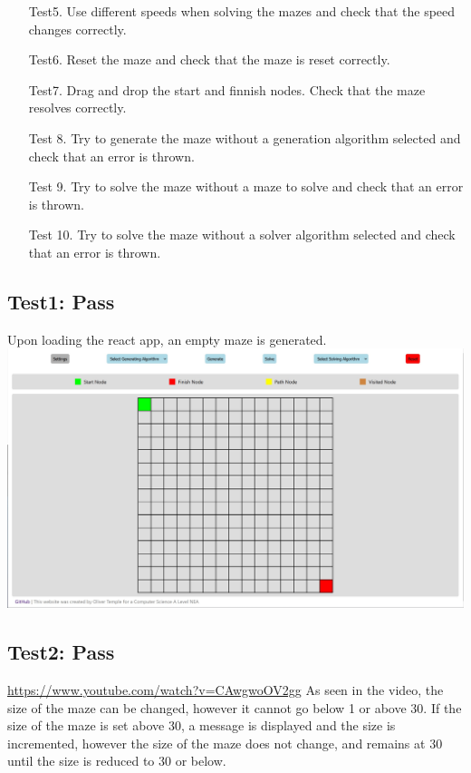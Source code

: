 \documentclass[titlepage]{article}
\begin{document}
\begin{enumerate}
\begin{enumerate}
    \end{enumerate} 
    \item[Test5.] Use different speeds when solving the mazes and check that the speed changes correctly.
    \item[Test6.] Reset the maze and check that the maze is reset correctly.
    \item[Test7.] Drag and drop the start and finnish nodes. Check that the maze resolves correctly. 
    \item[Test 8.] Try to generate the maze without a generation algorithm selected and check that an error is thrown.
    \item[Test 9.] Try to solve the maze without a maze to solve and check that an error is thrown.  
    \item[Test 10.] Try to solve the maze without a solver algorithm selected and check that an error is thrown. 
\end{enumerate}

\subsection*{Test1: Pass}
Upon loading the react app, an empty maze is generated.
\newline
\includegraphics[width=\linewidth]{assets/testing/test1.jpg}

\subsection*{Test2: Pass}
\url{https://www.youtube.com/watch?v=CAwgwoOV2gg}
As seen in the video, the size of the maze can be changed, however it cannot go below 1 or above 30. If the size of the maze is set above 30, a message is displayed and the size is incremented, however the size of the maze does not change, and remains at 30 until the size is reduced to 30 or below.
\end{document}
